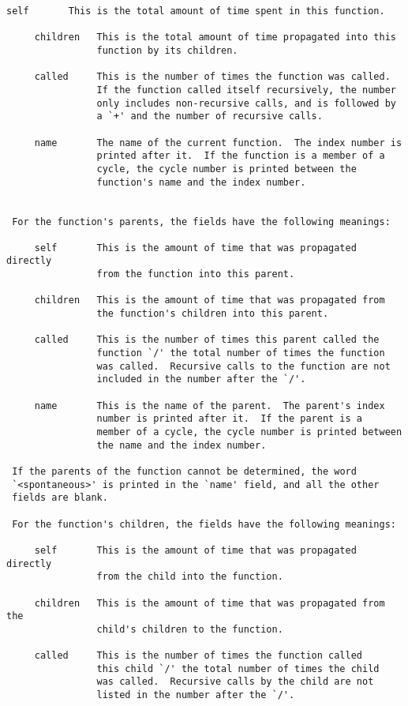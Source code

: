\documentclass[12pt]{article}
\begin{document}
\begin{lstlisting}[breaklines]
     self       This is the total amount of time spent in this function.

     children   This is the total amount of time propagated into this
                function by its children.

     called     This is the number of times the function was called.
                If the function called itself recursively, the number
                only includes non-recursive calls, and is followed by
                a `+' and the number of recursive calls.

     name       The name of the current function.  The index number is
                printed after it.  If the function is a member of a
                cycle, the cycle number is printed between the
                function's name and the index number.


 For the function's parents, the fields have the following meanings:

     self       This is the amount of time that was propagated directly
                from the function into this parent.

     children   This is the amount of time that was propagated from
                the function's children into this parent.

     called     This is the number of times this parent called the
                function `/' the total number of times the function
                was called.  Recursive calls to the function are not
                included in the number after the `/'.

     name       This is the name of the parent.  The parent's index
                number is printed after it.  If the parent is a
                member of a cycle, the cycle number is printed between
                the name and the index number.

 If the parents of the function cannot be determined, the word
 `<spontaneous>' is printed in the `name' field, and all the other
 fields are blank.

 For the function's children, the fields have the following meanings:

     self       This is the amount of time that was propagated directly
                from the child into the function.

     children   This is the amount of time that was propagated from the
                child's children to the function.

     called     This is the number of times the function called
                this child `/' the total number of times the child
                was called.  Recursive calls by the child are not
                listed in the number after the `/'.


\end{lstlisting}
\end{document}
